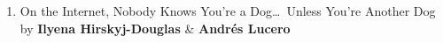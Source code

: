 \documentclass[aspectratio=169,12pt,noslidenumbers]{beamer} %
\begin{document}
\begin{frame}
\begin{enumerate}
  \item<1,3>
  On the Internet, Nobody Knows You're a Dog\dots~Unless You're Another Dog
  {\\\scriptsize by \textbf{Ilyena Hirskyj-Douglas} \& \textbf{Andrés Lucero}}

\end{enumerate}
\end{frame}
\end{document}
